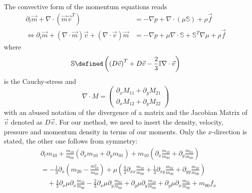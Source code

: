 
The convective form of the momentum equations reads
\begin{equation}
  \label{eq:compressible NS}
  \begin{aligned}
    \partial_t \vec{m} + \nabla \cdot (\vec{m}\vec{v}^T)
    &= - \nabla p + \nabla \cdot (\mu\mathbb{S}) + \rho \vec{f} \\
    \Leftrightarrow\partial_t \vec{m} + (\nabla \cdot \vec{m})\vec{v} + (\nabla \cdot \vec{v})\vec{m}
    &= - \nabla p + \mu \nabla \cdot \mathbb{S} + \mathbb{S}^T \nabla\mu + \rho \vec{f}
  \end{aligned}
\end{equation}
where
\begin{equation}
  \mathbb{S} \defined \left({(D\vec{v})}^T + D\vec{v} - \frac{2}{3}\mathbb{I}\nabla\cdot\vec{v} \right)
\end{equation}
is the Cauchy-stress and
\begin{equation}
  \nabla \cdot M =
  \begin{pmatrix}
    \partial_x M_{11} + \partial_y M_{21} \\
    \partial_x M_{12} + \partial_y M_{22}
  \end{pmatrix}
\end{equation}
with an abused notation of the divergence of a matrix and the Jacobian Matrix of $\vec{v}$ denoted as $D\vec{v}$.
For our method, we need to insert the density, velocity, pressure and momentum density in terms of our moments.
Only the $x$-direction is stated, the other one follows from symmetry:
\begin{equation}
  \begin{aligned}
    & \partial_t m_{10}
    + \frac{m_{10}}{m_{00}} (\partial_x m_{10} + \partial_y m_{01})
    + m_{10} (\partial_x \frac{m_{10}}{m_{00}} + \partial_y \frac{m_{01}}{m_{00}})  \\
    & =
     - \frac{1}{3} \partial_x \left(m_{20} - \frac{ m_{10}^2 }{ m_{00} } \right)
     + \mu \left(\frac{4}{3}\partial_{xx}\frac{m_{10}}{m_{00}}
            + \frac{1}{3}\partial_{xy} \frac{m_{01}}{m_{00}}
            + \partial_{yy} \frac{m_{10}}{m_{00}} \right) \\
    &\quad + \frac{4}{3}\partial_x \mu \partial_x \frac{m_{10}}{m_{00}}
    - \frac{2}{3}\partial_x \mu \partial_y \frac{m_{01}}{m_{00}}
    + \partial_y \mu \partial_y \frac{m_{10}}{m_{00}}
    + \partial_y \mu \partial_x \frac{m_{01}}{m_{00}}
    + m_{00}f_x
  \end{aligned}
\end{equation}
